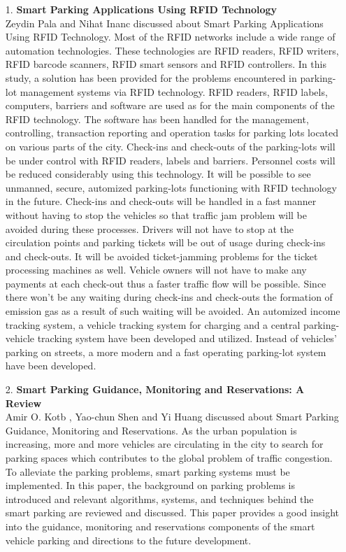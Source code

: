 \documentclass[12pt,a4paper]{report}
\begin{document}
\newpage
	\begin{itemize}
	\item[ 1. ] \textbf{Smart Parking Applications Using RFID Technology}\\
	
	Zeydin Pala and  Nihat Inanc discussed about Smart Parking Applications Using RFID Technology. Most of the RFID networks include a wide range of automation technologies. These technologies are RFID readers, RFID writers, RFID barcode scanners, RFID smart sensors and RFID controllers. In this study, a solution has been provided for the problems encountered in parking-lot management systems via RFID technology. RFID readers, RFID labels, computers, barriers and software are used as for the main components of the RFID technology. The software has been handled for the management, controlling, transaction reporting and operation tasks for parking lots located on various parts of the city. Check-ins and check-outs of the parking-lots will be under control with RFID readers, labels and barriers. Personnel costs will be reduced considerably using this technology. It will be possible to see unmanned, secure, automized parking-lots functioning with RFID technology in the future. Check-ins and check-outs will be handled in a fast manner without having to stop the vehicles so that traffic jam problem will be avoided during these processes. Drivers will not have to stop at the circulation points and parking tickets will be out of usage during check-ins and check-outs. It will be avoided ticket-jamming problems for the ticket processing machines as well. Vehicle owners will not have to make any payments at each check-out thus a faster traffic flow will be possible. Since there won't be any waiting during check-ins and check-outs the formation of emission gas as a result of such waiting will be avoided. An automized income tracking system, a vehicle tracking system for charging and a central parking-vehicle tracking system have been developed and utilized. Instead of vehicles' parking on streets, a more modern and a fast operating parking-lot system have been developed.
	
	\item[ 2. ] \textbf{Smart Parking Guidance, Monitoring and Reservations: A Review}\\
	
	Amir O. Kotb , Yao-chun Shen and Yi Huang discussed about Smart Parking Guidance, Monitoring and Reservations.
	As the urban population is increasing, more and more vehicles are circulating in the city to search for parking spaces which contributes to the global problem of traffic congestion. To alleviate the parking problems, smart parking systems must be implemented. In this paper, the background on parking problems is introduced and relevant algorithms, systems, and techniques behind the smart parking are reviewed and discussed. This paper provides a good insight into the guidance, monitoring and reservations components of the smart vehicle parking and directions to the future development.
	

\end{itemize}
\end{document}
